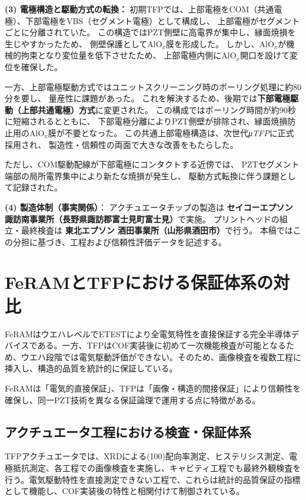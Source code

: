 \documentclass[conference]{IEEEtran}
\begin{document}
\medskip
\noindent
\textbf{(3) 電極構造と駆動方式の転換：}
初期TFPでは、上部電極をCOM（共通電極）、下部電極をVBS（セグメント電極）として構成し、
上部電極がセグメントごとに分離されていた。
この構造ではPZT側壁に高電界が集中し、縁面焼損を生じやすかったため、
側壁保護としてAlO$_x$膜を形成した。
しかし、AlO$_x$が機械的拘束となり変位量を低下させたため、
上部電極内側にAlO$_x$開口を設けて変位を確保した。

一方、上部電極駆動方式ではユニットスクリーニング時のポーリング処理に約80分を要し、
量産性に課題があった。
これを解決するため、後期では\textbf{下部電極駆動（上部共通電極）方式}に変更された。
この構成ではポーリング時間が約90秒に短縮されるとともに、
下部電極分離によりPZT側壁が排除され、縁面焼損防止用のAlO$_x$膜が不要となった。
この共通上部電極構造は、次世代\textit{μTFP}に正式採用され、
製造性・信頼性の両面で大きな改善をもたらした。

ただし、COM駆動配線が下部電極にコンタクトする近傍では、
PZTセグメント端部の局所電界集中により新たな焼損が発生し、
駆動方式転換に伴う課題として記録された。

\medskip
\noindent
\textbf{(4) 製造体制（事実関係）}：
アクチュエータチップの製造は
\textbf{セイコーエプソン 諏訪南事業所（長野県諏訪郡富士見町富士見）}で実施。
プリントヘッドの組立・最終検査は
\textbf{東北エプソン 酒田事業所（山形県酒田市）}で行う。
本稿ではこの分担に基づき、工程および信頼性評価データを記述する。

\section{FeRAMとTFPにおける保証体系の対比}
FeRAMはウエハレベルでETESTにより全電気特性を直接保証する完全半導体デバイスである。一方、TFPはCOF実装後に初めて一次機能検査が可能となるため、ウエハ段階では電気駆動評価ができない。そのため、画像検査を複数工程に挿入し、構造的品質を統計的に保証している。

FeRAMは「電気的直接保証」、TFPは「画像・構造的間接保証」により信頼性を確保し、同一PZT技術を異なる保証論理で運用する点に特徴がある。

\subsection{アクチュエータ工程における検査・保証体系}
TFPアクチュエータでは、XRDによる(100)配向率測定、ヒステリシス測定、電極抵抗測定、各工程での画像検査を実施し、キャビティ工程でも最終外観検査を行う。電気駆動特性を直接測定できない工程で、これらは統計的品質保証の指標として機能し、COF実装後の特性と相関付けて制御されている。
\end{document}
